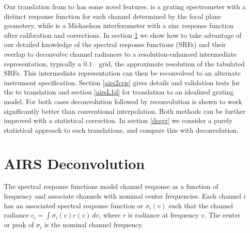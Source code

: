 \documentclass[10pt,twocolumn]{article}
\begin{document}
Our translation from {\airs} to {\cris} has some novel features.
{\airs} is a grating spectrometer with a distinct response function
for each channel determined by the focal plane geometery, while
{\cris} is a Michaelson interferometer with a sinc response
function after calibration and corrections.  In section \ref{decon}
we show how to take advantage of our detailed knowledge of the
{\airs} spectral response functions (SRFs) and their overlap to
deconvolve channel radiances to a resolution-enhanced intermediate
representation, typically a $0.1$~\wn\ grid, the approximate
resolution of the tabulated {\airs} SRFs.  
This intermediate representation can then be reconvolved to an
alternate instrument specification.  Section \ref{airs2cris} gives
details and validation tests for the {\airs} to {\cris} translation
and section \ref{airsL1d} for translation to an idealized grating
model.  For both cases deconvolution followed by reconvolution is
shown to work significantly better than conventional interpolation.
Both methods can be further improved with a statistical correction.
In section \ref{dregr} we consider a purely statistical approach to
such translations, and compare this with deconvolution.

\section{AIRS Deconvolution}
\label{decon}

The {\airs} spectral response functions model channel response as a
function of frequency and associate channels with nominal center
frequencies.  Each {\airs} channel $i$ has an associated spectral
response function or {\srf} $\sigma_i(v)$ such that the channel
radiance $c_i = \int \sigma_i(v)r(v)\,dv$, where $r$ is radiance at
frequency $v$.  The center or peak of $\sigma_i$ is the nominal
channel frequency.
\end{document}
